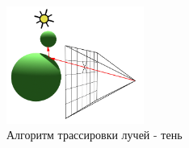 \begin{figure}[ht]
  \centering
  \includegraphics[width=0.4\textwidth]{img/shadow_ray.png}
  \caption{Алгоритм трассировки лучей - тень}
\end{figure}

